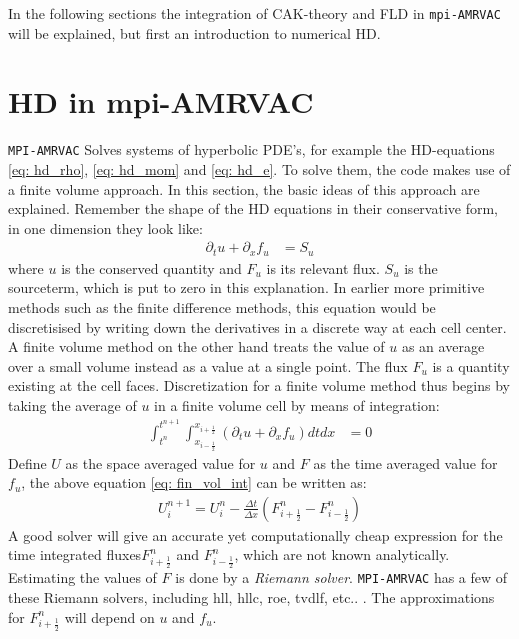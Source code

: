 In the following sections the integration of CAK-theory and FLD in \texttt{mpi-AMRVAC} will be explained, but first an introduction to numerical HD.


\section{HD in mpi-AMRVAC}
\texttt{MPI-AMRVAC} Solves systems of hyperbolic PDE's, for example the HD-equations \eqref{eq: hd_rho}, \eqref{eq: hd_mom} and \eqref{eq: hd_e}. To solve them, the code makes use of a finite volume approach. In this section, the basic ideas of this approach are explained. Remember the shape of the HD equations in their conservative form, in one dimension they look like:
\begin{align}
\partial_t u + \partial_x f_u &= S_u \label{eq: cons form}
\end{align}
where $u$ is the conserved quantity and $F_u$ is its relevant flux. $S_u$ is the sourceterm, which is put to zero in this explanation. In earlier more primitive methods such as the finite difference methods, this equation would be discretisised by writing down the derivatives in a discrete way at each cell center. A finite volume method on the other hand treats the value of $u$ as an average over a small volume instead as a value at a single point. The flux $F_u$ is a quantity existing at the cell faces. Discretization for a finite volume method thus begins by taking the average of $u$ in a finite volume cell by means of integration:
\begin{align} 
\int_{t^n}^{t^{n+1}} \int_{x_{i-\frac{1}{2}}}^{x_{i+\frac{1}{2}}} \left( \partial_t u + \partial_x f_u \right) dt dx &= 0  \label{eq: fin_vol_int}
\end{align}
Define $U$ as the space averaged value for $u$ and $F$ as the time averaged value for $f_u$, the above equation \ref{eq: fin_vol_int} can be written as:
\begin{align}
U^{n+1}_i = U^n_i - \frac{\Delta t}{\Delta x}\left(F^n_{i+\frac{1}{2}} - F^n_{i-\frac{1}{2}} \right) 
\end{align}
A good solver will give an accurate yet computationally cheap expression for the time integrated fluxes$F^n_{i+\frac{1}{2}}$ and $F^n_{i-\frac{1}{2}}$, which are not known analytically. Estimating the values of $F$ is done by a \emph{Riemann solver}. \texttt{MPI-AMRVAC} has a few of these Riemann solvers, including  hll, hllc, roe, tvdlf, etc.. \cite{Toth1996}. The approximations for $F^n_{i+\frac{1}{2}}$ will depend on $u$ and $f_u$.\\ 

